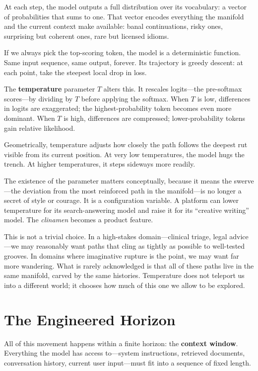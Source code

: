 \documentclass[12pt,a4paper]{article}
\begin{document}
At each step, the model outputs a full distribution over its vocabulary: a vector of probabilities that sums to one. That vector encodes everything the manifold and the current context make available: banal continuations, risky ones, surprising but coherent ones, rare but licensed idioms.

If we always pick the top-scoring token, the model is a deterministic function. Same input sequence, same output, forever. Its trajectory is greedy descent: at each point, take the steepest local drop in loss.

The \textbf{temperature} parameter $T$ alters this. It rescales logits---the pre-softmax scores---by dividing by $T$ before applying the softmax. When $T$ is low, differences in logits are exaggerated; the highest-probability token becomes even more dominant. When $T$ is high, differences are compressed; lower-probability tokens gain relative likelihood.

Geometrically, temperature adjusts how closely the path follows the deepest rut visible from its current position. At very low temperatures, the model hugs the trench. At higher temperatures, it steps sideways more readily.

The existence of the parameter matters conceptually, because it means the swerve---the deviation from the most reinforced path in the manifold---is no longer a secret of style or courage. It is a configuration variable. A platform can lower temperature for its search-answering model and raise it for its ``creative writing'' model. The \emph{clinamen} becomes a product feature.

This is not a trivial choice. In a high-stakes domain---clinical triage, legal advice---we may reasonably want paths that cling as tightly as possible to well-tested grooves. In domains where imaginative rupture is the point, we may want far more wandering. What is rarely acknowledged is that all of these paths live in the same manifold, carved by the same histories. Temperature does not teleport us into a different world; it chooses how much of this one we allow to be explored.

\section{The Engineered Horizon}

All of this movement happens within a finite horizon: the \textbf{context window}. Everything the model has access to---system instructions, retrieved documents, conversation history, current user input---must fit into a sequence of fixed length.
\end{document}
